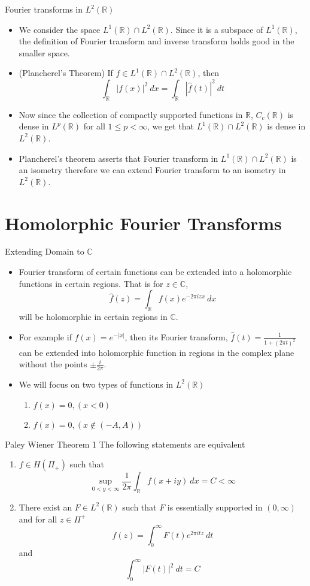 \documentclass[compress]{beamer}
\newcommand{\R}{\mathbb R}
\newcommand{\C}{\mathbb C}
\begin{document}
\begin{frame}{Fourier transforms in $L^2(\R)$}
  \begin{itemize}
    \item We consider the space $L^1(\R) \cap L^2(\R)$. Since it is a subspace of $L^1(\R)$, the definition of Fourier transform and inverse transform holds good in the smaller space.
    \item (Plancherel's Theorem) If $f \in L^1(\R) \cap L^2(\R)$, then $$\int_\R |f(x)|^2 \ dx = \int_\R |\hat{f}(t)|^2 \ dt$$
    \item Now since the collection of compactly supported functions in $\R$, $C_c(\R)$ is dense in $L^p(\R)$ for all $1 \le p < \infty$, we get that $L^1(\R) \cap L^2(\R)$ is dense in $L^2(\R)$.
    \item Plancherel's theorem asserts that Fourier transform in $L^1(\R) \cap L^2(\R)$ is an isometry therefore we can extend Fourier transform to an isometry in $L^2(\R)$.
  \end{itemize}
\end{frame}


\section{Homolorphic Fourier Transforms}
\begin{frame}{Extending Domain to $\C$}
  \begin{itemize}
    \item Fourier transform of certain functions can be extended into a holomorphic functions in certain regions. That is for $z \in \C$, $$\hat{f}(z) = \int_\R f(x)e^{-2\pi izx} \ dx $$
      will be holomorphic in certain regions in $\C$.
    \item For example if $f(x) = e^{-|x|}$, then its Fourier transform, $\hat{f}(t) = \frac{1}{1+(2\pi t)^2}$ can be extended into holomorphic function in regions in the complex plane without the points $\pm \frac{i}{2\pi}$.
    \item We will focus on two types of functions in $L^2(\R)$
      \begin{enumerate}
        \item $f(x) = 0, (x<0)$
        \item $f(x) = 0, (x \notin (-A, A))$
      \end{enumerate}
  \end{itemize}
\end{frame}

\begin{frame}{Paley Wiener Theorem 1}
  The following statements are equivalent
  \begin{enumerate}
    \item $f \in H(\Pi_+)$ such that $$\sup_{0<y<\infty} \frac{1}{2\pi}\int_\R f(x+iy) \ dx = C < \infty$$
    \item There exist an $F \in L^2(\R)$ such that $F$ is essentially supported in $(0, \infty)$ and for all $z \in \Pi^+$ $$f(z) = \int_0^\infty F(t) e^{2\pi it z} \ dt$$
      and $$\int_0^\infty |F(t)|^2 \ dt = C$$
  \end{enumerate}
\end{frame}
\end{document}
